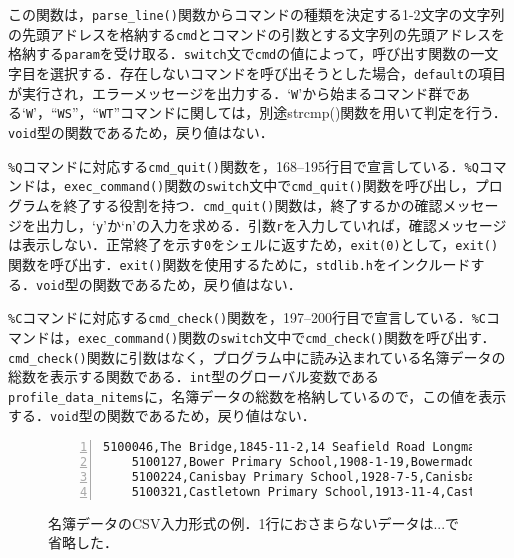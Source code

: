この関数は，\verb|parse_line()|関数からコマンドの種類を決定する1-2文字の文字列の先頭アドレスを格納する\verb|cmd|とコマンドの引数とする文字列の先頭アドレスを格納する\verb|param|を受け取る．\verb|switch|文で\verb|cmd|の値によって，呼び出す関数の一文字目を選択する．存在しないコマンドを呼び出そうとした場合，\verb|default|の項目が実行され，エラーメッセージを出力する．‘\verb|W|’から始まるコマンド群である‘\verb|W|’，“\verb|WS|”，“\verb|WT|”コマンドに関しては，別途strcmp()関数を用いて判定を行う．\verb|void|型の関数であるため，戻り値はない．

\verb|%Q|コマンドに対応する\verb|cmd_quit()|関数を，168--195行目で宣言している．\verb|%Q|コマンドは，\verb|exec_command()|関数の\verb|switch|文中で\verb|cmd_quit()|関数を呼び出し，プログラムを終了する役割を持つ．\verb|cmd_quit()|関数は，終了するかの確認メッセージを出力し，‘\verb|y|’か‘\verb|n|’の入力を求める．引数\verb|r|を入力していれば，確認メッセージは表示しない．正常終了を示す\verb|0|をシェルに返すため，\verb|exit(0)|として，\verb|exit()|関数を呼び出す．\verb|exit()|関数を使用するために，\verb|stdlib.h|をインクルードする．\verb|void|型の関数であるため，戻り値はない．

\verb|%C|コマンドに対応する\verb|cmd_check()|関数を，197--200行目で宣言している．\verb|%C|コマンドは，\verb|exec_command()|関数の\verb|switch|文中で\verb|cmd_check()|関数を呼び出す．\verb|cmd_check()|関数に引数はなく，プログラム中に読み込まれている名簿データの総数を表示する関数である．\verb|int|型のグローバル変数である\verb|profile_data_nitems|に，名簿データの総数を格納しているので，この値を表示する．\verb|void|型の関数であるため，戻り値はない．


\begin{figure}[b]
\centering %
\begin{Verbatim}[frame=single, xleftmargin=5mm, xrightmargin=5mm, gobble=4,
                 fontsize=\small, numbers=left, firstnumber=1]
    5100046,The Bridge,1845-11-2,14 Seafield Road Longman Inverness,SEN Unit 2.0 Open
    5100127,Bower Primary School,1908-1-19,Bowermadden Bower Caithness,01955 641225 ...
    5100224,Canisbay Primary School,1928-7-5,Canisbay Wick,01955 611337 Primary 56 3...
    5100321,Castletown Primary School,1913-11-4,Castletown Thurso,01847 821256 01847...
\end{Verbatim}
    \caption{名簿データのCSV入力形式の例．1行におさまらないデータは...で省略した．}
    \label{fig:csvdata}
\end{figure}

